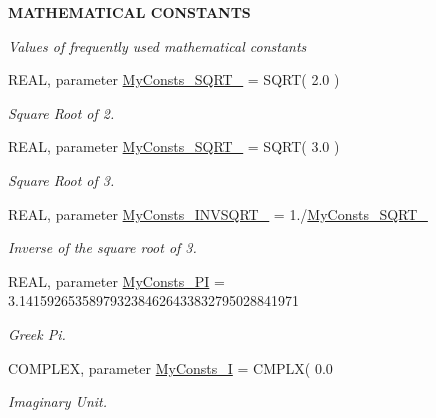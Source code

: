 \begin{Indent}{\bf MATHEMATICAL CONSTANTS}\par
{\em \label{_amgrp84277d81319af617f28dca6319eed8fe}
Values of frequently used mathematical constants }\begin{DoxyCompactItemize}
\item 
REAL, parameter \hyperlink{namespace_my_consts_a6e68542f43fce6ab1f7e252239b4a25b}{MyConsts\_\-SQRT\_} = SQRT( 2.0 )
\begin{DoxyCompactList}\small\item\em Square Root of 2. \item\end{DoxyCompactList}\item 
REAL, parameter \hyperlink{namespace_my_consts_a929edc066c350d2da103fc05a425cf82}{MyConsts\_\-SQRT\_} = SQRT( 3.0 )
\begin{DoxyCompactList}\small\item\em Square Root of 3. \item\end{DoxyCompactList}\item 
REAL, parameter \hyperlink{namespace_my_consts_af9c57a57cecb201806c7ab5d3095ee96}{MyConsts\_\-INVSQRT\_} = 1./\hyperlink{namespace_my_consts_a929edc066c350d2da103fc05a425cf82}{MyConsts\_\-SQRT\_}
\begin{DoxyCompactList}\small\item\em Inverse of the square root of 3. \item\end{DoxyCompactList}\item 
REAL, parameter \hyperlink{namespace_my_consts_a269bb97656a3220bb770f00b1a25bf4c}{MyConsts\_\-PI} = 3.1415926535897932384626433832795028841971
\begin{DoxyCompactList}\small\item\em Greek Pi. \item\end{DoxyCompactList}\item 
COMPLEX, parameter \hyperlink{namespace_my_consts_ac8a82909a7db530fcc275af18b798094}{MyConsts\_\-I} = CMPLX( 0.0
\begin{DoxyCompactList}\small\item\em Imaginary Unit. \item\end{DoxyCompactList}\end{DoxyCompactItemize}
\end{Indent}
